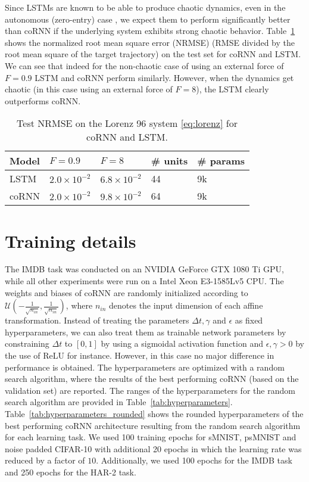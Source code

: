 \documentclass{article} \usepackage{iclr2021_conference,times}
\newcommand{\Dt}{{\Delta t}}
\newcommand{\Tref}[1]{Table~\ref{#1}}
\begin{document}
Since LSTMs are known to be able to produce chaotic dynamics, even in the autonomous (zero-entry) case \citep{chaotic_lstm}, we expect them to perform significantly better than coRNN if the underlying system exhibits strong chaotic behavior. 
\Tref{tab:lorenz} shows the normalized root mean square error (NRMSE) (RMSE divided by the root mean square of the target trajectory) on the test set for coRNN and LSTM. We can see that indeed for the non-chaotic case of using an external force of $F=0.9$ LSTM and coRNN perform similarly. However, when the dynamics get chaotic (in this case using an external force of $F=8$), the LSTM clearly outperforms coRNN. 
\begin{table}[h!]
  \caption{Test NRMSE on the Lorenz 96 system \eqref{eq:lorenz} for coRNN and LSTM.}
  \label{tab:lorenz}
  \centering
  \begin{tabular}{lllll}
    \toprule
    \cmidrule(r){1-5}
    Model & $F=0.9$ & $F=8$ & \# units & \# params \\
        \midrule
    LSTM & $2.0\times 10^{-2}$& $6.8\times 10^{-2}$ & 44 & 9k\\
    coRNN & $2.0\times 10^{-2}$ & $9.8\times 10^{-2}$ & 64 & 9k\\
    \bottomrule
  \end{tabular}
\end{table}



\section{Training details}
\label{app:training_details}
The IMDB task was conducted on an NVIDIA GeForce GTX 1080 Ti GPU, while all other experiments were run on a Intel Xeon E3-1585Lv5 CPU.
The weights and biases of coRNN are randomly initialized according to $\mathcal{U}(-\frac{1}{\sqrt{n_{in}}},\frac{1}{\sqrt{n_{in}}})$, where $n_{in}$ denotes the input dimension of each affine transformation. Instead of treating the parameters $\Dt, \gamma$ and $\epsilon$ as fixed hyperparameters, we can also treat them as trainable network parameters by constraining $\Dt$ to $[0,1]$ by using a sigmoidal activation function and $\epsilon, \gamma >0$ by the use of ReLU for instance. However, in this case no major difference in performance is obtained.
The hyperparameters are optimized with a random search algorithm, where the results of the best performing coRNN (based on the validation set) are reported. The ranges of the hyperparameters for the random search algorithm are provided in \Tref{tab:hyperparameters}. \Tref{tab:hyperparameters_rounded} shows the rounded hyperparameters of the best performing coRNN architecture resulting from the random search algorithm for each learning task. We used 100 training epochs for sMNIST, psMNIST and noise padded CIFAR-10 with additional 20 epochs in which the learning rate was reduced by a factor of $10$. Additionally, we used 100 epochs for the IMDB task and 250 epochs for the HAR-2 task.
\end{document}
